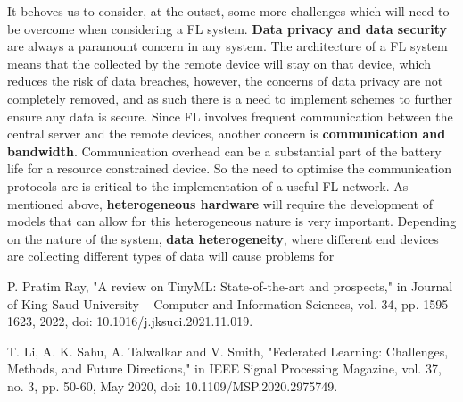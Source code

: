 \documentclass[conference]{IEEEtran}
\begin{document}
It behoves us to consider, at the outset, some more challenges which will need to be overcome when considering a FL system. \textbf{Data privacy and data security} are always a paramount concern in any system. The architecture of a FL system means that the collected by the remote device will stay on that device, which reduces the risk of data breaches, however, the concerns of data privacy are not completely removed, and as such there is a need to implement schemes to further ensure any data is secure. Since FL involves frequent communication between the central server and the remote devices, another concern is \textbf{communication and bandwidth}. Communication overhead can be a substantial part of the battery life for a resource constrained device. So the need to optimise the communication protocols are is critical to the implementation of a useful FL network. As mentioned above, \textbf{heterogeneous hardware} will require the development of models that can allow for this heterogeneous nature is very important. Depending on the nature of the system, \textbf{data heterogeneity}, where different end devices are collecting different types of data will cause problems for 



\begin{thebibliography}{00}
 P. Pratim Ray, "A review on TinyML: State-of-the-art and prospects," in Journal of King Saud University –
Computer and Information Sciences, vol. 34, pp. 1595-1623, 2022, doi: 10.1016/j.jksuci.2021.11.019.

 T. Li, A. K. Sahu, A. Talwalkar and V. Smith, "Federated Learning: Challenges, Methods, and Future Directions," in IEEE Signal Processing Magazine, vol. 37, no. 3, pp. 50-60, May 2020, doi: 10.1109/MSP.2020.2975749.
\end{thebibliography}
\vspace{12pt}
\end{document}
